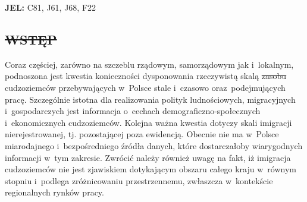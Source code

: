 \documentclass[12pt,a4paper]{article}
\providecommand{\DIFadd}[1]{{\protect\color{blue}\uwave{#1}}} %
\providecommand{\DIFdel}[1]{{\protect\color{red}\sout{#1}}}                      %
\providecommand{\DIFaddbegin}{} %
\providecommand{\DIFaddend}{} %
\providecommand{\DIFdelbegin}{} %
\providecommand{\DIFdelend}{} %
\begin{document}
\DIFaddend \textbf{JEL:} C81, J61, J68, F22
\DIFaddbegin 

\DIFaddend \begin{center}
\DIFdelbegin \section*{\DIFdel{WSTĘP}}
\DIFdelend \DIFaddbegin \DIFadd{WSTĘP
}\DIFaddend \end{center}

Coraz częściej, zarówno na szczeblu rządowym, samorządowym jak i~lokalnym, podnoszona jest kwestia konieczności dysponowania rzeczywistą skalą \DIFdelbegin \DIFdel{zasobu }\DIFdelend \DIFaddbegin \DIFadd{liczby }\DIFaddend cudzoziemców przebywających w~Polsce stale i~czasowo oraz~podejmujących pracę. Szczególnie istotna dla realizowania polityk ludnościowych, migracyjnych i~gospodarczych jest informacja o~cechach demograficzno-społecznych i~ekonomicznych cudzoziemców. Kolejna ważna kwestia dotyczy skali imigracji nierejestrowanej, tj. pozostającej poza ewidencją. Obecnie nie ma w~Polsce miarodajnego i~bezpośredniego źródła danych, które dostarczałoby wiarygodnych informacji w~tym zakresie. Zwrócić należy również uwagę na fakt, iż imigracja cudzoziemców nie jest zjawiskiem dotykającym obszaru całego kraju w~równym stopniu i~podlega zróżnicowaniu przestrzennemu, zwłaszcza w~kontekście regionalnych rynków pracy. 
\end{document}
